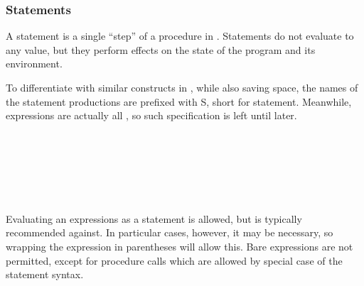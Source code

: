 \subsubsection{Statements}

A statement is a single ``step'' of a procedure in \Prose{}. Statements do not
evaluate to any value, but they perform effects on the state of the program and
its environment.

To differentiate with similar constructs in \Poetry{}, while also saving space,
the names of the statement productions are prefixed with S, short for statement.
Meanwhile, expressions are actually all \Poetry{}, so such specification is left
until later.

\begin{bnf*}
     \\
     \\
     \\
     \\
     \\
\end{bnf*}

Evaluating an expressions as a statement is allowed, but is typically
recommended against. In particular cases, however, it may be necessary,
so wrapping the expression in parentheses will allow this. Bare expressions
are not permitted, except for procedure calls which are allowed by special
case of the statement syntax.

\begin{prooftree}
\end{prooftree}

